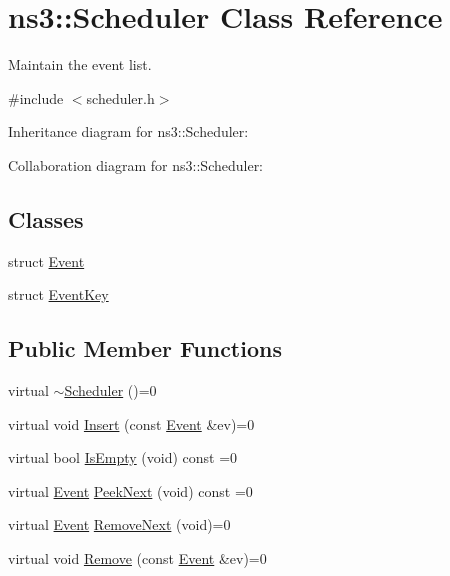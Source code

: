 \hypertarget{classns3_1_1Scheduler}{}\section{ns3\+:\+:Scheduler Class Reference}
\label{classns3_1_1Scheduler}


Maintain the event list.  




{\ttfamily \#include $<$scheduler.\+h$>$}



Inheritance diagram for ns3\+:\+:Scheduler\+:


Collaboration diagram for ns3\+:\+:Scheduler\+:
\subsection*{Classes}
\begin{DoxyCompactItemize}
\item 
struct \hyperlink{structns3_1_1Scheduler_1_1Event}{Event}
\item 
struct \hyperlink{structns3_1_1Scheduler_1_1EventKey}{Event\+Key}
\end{DoxyCompactItemize}
\subsection*{Public Member Functions}
\begin{DoxyCompactItemize}
\item 
virtual \hyperlink{classns3_1_1Scheduler_a7aead526c54e11c0df76af0b9bd18af6}{$\sim$\+Scheduler} ()=0
\item 
virtual void \hyperlink{classns3_1_1Scheduler_a9982bffa716e430ba599ded998b77d90}{Insert} (const \hyperlink{structns3_1_1Scheduler_1_1Event}{Event} \&ev)=0
\item 
virtual bool \hyperlink{classns3_1_1Scheduler_a503d02afa89722af78dc9746c5208d47}{Is\+Empty} (void) const =0
\item 
virtual \hyperlink{structns3_1_1Scheduler_1_1Event}{Event} \hyperlink{classns3_1_1Scheduler_a734576c6f195c51c552389d692b362cf}{Peek\+Next} (void) const =0
\item 
virtual \hyperlink{structns3_1_1Scheduler_1_1Event}{Event} \hyperlink{classns3_1_1Scheduler_acc5e570b9be6952fb1f349476dd8cc89}{Remove\+Next} (void)=0
\item 
virtual void \hyperlink{classns3_1_1Scheduler_a481d54e1b0e3c777629fd775862c66ca}{Remove} (const \hyperlink{structns3_1_1Scheduler_1_1Event}{Event} \&ev)=0
\end{DoxyCompactItemize}
